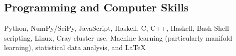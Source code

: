 \documentclass[margin,line]{resume}
\begin{document}
\begin{resume}
    \section{\mysidestyle Programming and Computer Skills} 

    Python, NumPy/SciPy, JavaScript, Haskell, C, C++, Haskell, Bash Shell scripting, Linux, Cray cluster use, Machine learning (particularly manifold learning), statistical data analysis, and \LaTeX \\
    \vspace{-2mm}

\end{resume}
\end{document}

